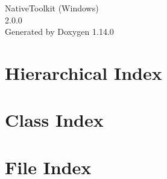 \documentclass[twoside]{book}
\newcommand{\+}{\discretionary{\mbox{\scriptsize$\hookleftarrow$}}{}{}}
\newcommand{\clearemptydoublepage}{%
    \newpage{\pagestyle{empty}\cleardoublepage}%
  }
\begin{document}
  \raggedbottom
    \hypersetup{pageanchor=false,
                bookmarksnumbered=true,
                pdfencoding=unicode
               }
  \begin{titlepage}
  \vspace*{7cm}
  \begin{center}%
  {\Large Native\+Toolkit (\+Windows)}\\
  [1ex]\large 2.\+0.\+0 \\
  \vspace*{1cm}
  {\large Generated by Doxygen 1.14.0}\\
  \end{center}
  \end{titlepage}
  \clearemptydoublepage
  \tableofcontents
  \clearemptydoublepage
  \hypersetup{pageanchor=true}
\chapter{Hierarchical Index}

\chapter{Class Index}

\chapter{File Index}

\end{document}
